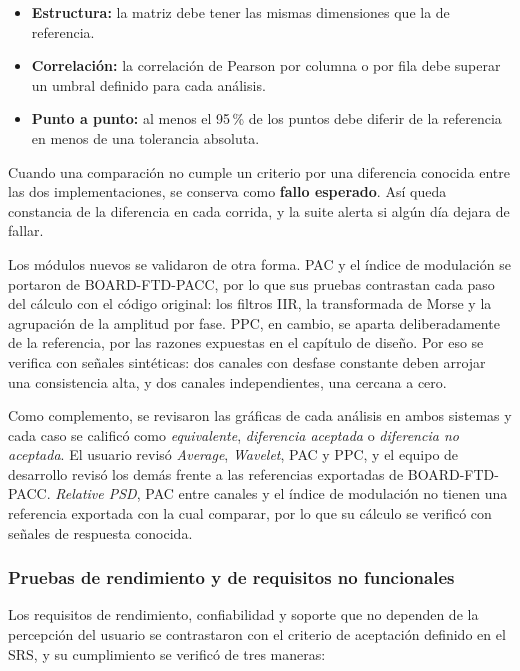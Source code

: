 \documentclass[12pt,letterpaper,oneside]{article}
\begin{document}
\begin{itemize}
  \item \textbf{Estructura:} la matriz debe tener las mismas dimensiones que la de referencia.
  \item \textbf{Correlación:} la correlación de Pearson por columna o por fila debe superar un umbral definido para cada análisis.
  \item \textbf{Punto a punto:} al menos el 95\,\% de los puntos debe diferir de la referencia en menos de una tolerancia absoluta.
\end{itemize}

Cuando una comparación no cumple un criterio por una diferencia conocida entre las dos implementaciones, se conserva como \textbf{fallo esperado}. Así queda constancia de la diferencia en cada corrida, y la suite alerta si algún día dejara de fallar.

Los módulos nuevos se validaron de otra forma. PAC y el índice de modulación se portaron de BOARD-FTD-PACC, por lo que sus pruebas contrastan cada paso del cálculo con el código original: los filtros IIR, la transformada de Morse y la agrupación de la amplitud por fase. PPC, en cambio, se aparta deliberadamente de la referencia, por las razones expuestas en el capítulo de diseño. Por eso se verifica con señales sintéticas: dos canales con desfase constante deben arrojar una consistencia alta, y dos canales independientes, una cercana a cero.

Como complemento, se revisaron las gráficas de cada análisis en ambos sistemas y cada caso se calificó como \textit{equivalente}, \textit{diferencia aceptada} o \textit{diferencia no aceptada}. El usuario revisó \textit{Average}, \textit{Wavelet}, PAC y PPC, y el equipo de desarrollo revisó los demás frente a las referencias exportadas de BOARD-FTD-PACC. \textit{Relative PSD}, PAC entre canales y el índice de modulación no tienen una referencia exportada con la cual comparar, por lo que su cálculo se verificó con señales de respuesta conocida.

\subsubsection{Pruebas de rendimiento y de requisitos no funcionales}

Los requisitos de rendimiento, confiabilidad y soporte que no dependen de la percepción del usuario se contrastaron con el criterio de aceptación definido en el SRS, y su cumplimiento se verificó de tres maneras:
\end{document}
